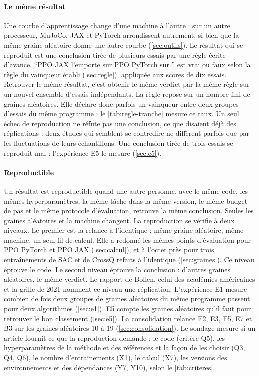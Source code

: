 \paragraph{Le même résultat}
Une courbe d'apprentissage change d'une machine à l'autre : sur un autre processeur, MuJoCo,
JAX et PyTorch arrondissent autrement, si bien que la même graine aléatoire donne une autre courbe
(\cref{sec:outils}). Le résultat qui se reproduit est une conclusion tirée de plusieurs essais par une
règle écrite d'avance. \enquote{PPO JAX l'emporte sur PPO PyTorch sur } est vrai ou faux
selon la règle du vainqueur établi (\cref{sec:regle}), appliquée aux scores de dix essais. Retrouver le
même résultat, c'est obtenir le même verdict par la même règle sur un nouvel ensemble d'essais
indépendants. La règle repose sur un nombre fini de graines aléatoires. Elle déclare donc parfois un
vainqueur entre deux groupes d'essais du même programme : le \cref{tab:regle-tranche} mesure ce taux.
Un seul échec de reproduction ne réfute pas une conclusion, ce que \textcite[p.~4]{bollen2015robust}
disaient déjà des réplications : deux études qui semblent se contredire ne diffèrent parfois que par
les fluctuations de leurs échantillons. Une conclusion tirée de trois essais se
reproduit mal : l'expérience E5 le mesure (\cref{sec:e5}).

\paragraph{Reproductible}
Un résultat est reproductible quand une autre personne, avec le même code, les mêmes hyperparamètres, la
même tâche dans la même version, le même budget de pas et le même protocole d'évaluation, retrouve la même
conclusion. Seules les graines aléatoires et la machine changent. La reproduction se vérifie à deux
niveaux. Le premier est la relance à l'identique : même graine aléatoire, même machine, un seul fil de calcul. Elle a redonné les mêmes points
d'évaluation pour PPO PyTorch et PPO JAX (\cref{sec:calcul}), et à l'octet près pour trois entraînements de SAC
et de CrossQ refaits à l'identique (\cref{sec:graines}). Ce niveau éprouve le code. Le second niveau éprouve la conclusion : d'autres graines
aléatoires, le même verdict. Le rapport de Bollen, celui des académies américaines et la grille de 2021 nomment ce niveau une réplication. L'expérience E1 mesure combien de fois deux groupes de graines aléatoires du
même programme passent pour deux algorithmes (\cref{sec:e1}). E5 compte les graines aléatoires qu'il faut
pour retrouver le bon classement (\cref{sec:e5}). La consolidation relance E2, E3, E5, E7 et B3 sur les
graines aléatoires 10 à 19 (\cref{sec:consolidation}). Le sondage mesure si un article fournit ce que la
reproduction demande : le code (critère Q5), les hyperparamètres de la méthode et des références et la
façon de les choisir (Q3, Q4, Q6), le nombre d'entraînements (X1), le calcul (X7), les versions des
environnements et des dépendances (Y7, Y10), selon le \cref{tab:criteres}.

